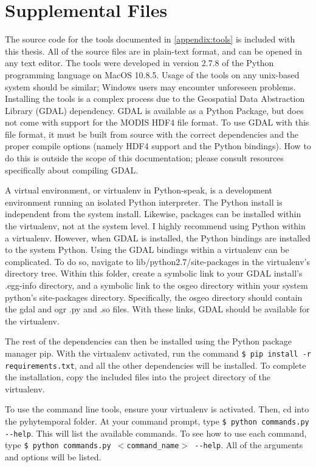 \chapter{Supplemental Files}
\label{appendix:files}

The source code for the tools documented in \cref{appendix:tools} is included with this thesis. All of the source files are in plain-text format, and can be opened in any text editor. The tools were developed in version 2.7.8 of the Python programming language \autocite{python2.7.8} on MacOS 10.8.5. Usage of the tools on any unix-based system should be similar; Windows users may encounter unforeseen problems. Installing the tools is a complex process due to the Geospatial Data Abstraction Library (GDAL) dependency. GDAL is available as a Python Package, but does not come with support for the MODIS HDF4 file format. To use GDAL with this file format, it must be built from source with the correct dependencies and the proper compile options (namely HDF4 support and the Python bindings). How to do this is outside the scope of this documentation; please consult resources specifically about compiling GDAL.

A virtual environment, or virtualenv in Python-speak, is a development environment running an isolated Python interpreter. The Python install is independent from the system install. Likewise, packages can be installed within the virtualenv, not at the system level. I highly recommend using Python within a virtualenv. However, when GDAL is installed, the Python bindings are installed to the system Python. Using the GDAL bindings within a virtualenv can be complicated. To do so, navigate to lib/python2.7/site-packages in the virtualenv's directory tree. Within this folder, create a symbolic link to your GDAL install's .egg-info directory, and a symbolic link to the osgeo directory within your system python's site-packages directory. Specifically, the osgeo directory should contain the gdal and ogr .py and .so files. With these links, GDAL should be available for the virtualenv.

The rest of the dependencies can then be installed using the Python package manager pip. With the virtualenv activated, run the command \texttt{\small\$ pip install -r requirements.txt}, and all the other dependencies will be installed. To complete the installation, copy the included files into the project directory of the virtualenv.

To use the command line tools, ensure your virtualenv is activated. Then, cd into the pyhytemporal folder. At your command prompt, type \texttt{\small\$ python commands.py {{-}{-}help}}. This will list the available commands. To see how to use each command, type \texttt{\small\$ python commands.py $<$command\_name$>$ {{-}{-}help}}. All of the arguments and options will be listed.

